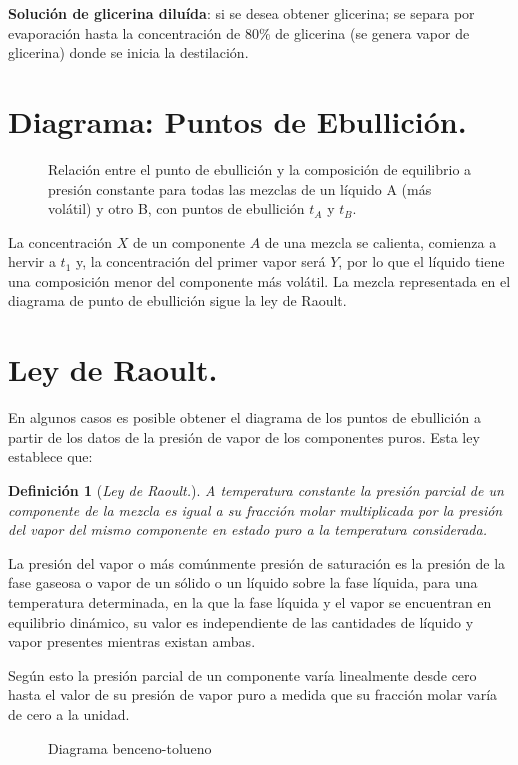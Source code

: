 \documentclass[11pt,openany]{book}
\newtheorem{defi}{Definición}
\begin{document}
\textbf{Solución de glicerina diluída}: si se desea obtener glicerina; se separa por evaporación hasta la 
concentración de 80\% de glicerina (se genera vapor de glicerina) donde se inicia la destilación.

\section{Diagrama: Puntos de Ebullición.}
\begin{figure}[h]

\caption{Relación entre el punto de ebullición y la composición de equilibrio a presión constante para todas las 
mezclas de un líquido A (más volátil) y otro B, con puntos de ebullición $t_A$ y $t_B$.
}
\end{figure}

La concentración $X$ de un componente $A$ de una mezcla se calienta, comienza a hervir a $t_1$ y, la 
concentración del primer vapor será $Y$, por lo que el líquido tiene una composición menor del componente más volátil.
La mezcla representada en el diagrama de punto de ebullición sigue la ley de Raoult.

\section{Ley de Raoult.}

En algunos casos es posible obtener el diagrama de los puntos de ebullición a partir de los datos de
 la presión de vapor de los componentes puros. Esta ley establece que: 
\begin{defi}[\textit{Ley de Raoult.}]
 A temperatura constante la presión parcial de un componente de la mezcla es igual a su fracción molar multiplicada por la 
 presión del vapor del mismo componente en estado puro a la temperatura considerada.
\end{defi}
 La presión del vapor o más comúnmente presión de saturación es la presión de la fase gaseosa o 
 vapor de un sólido o un líquido sobre la fase líquida, para una temperatura determinada, en la que 
 la fase líquida y el vapor se encuentran en equilibrio dinámico, su valor es independiente de las 
 cantidades de líquido y vapor presentes mientras existan ambas.

 Según esto la presión parcial de un componente varía linealmente desde cero hasta el valor de su 
 presión de vapor puro a medida que su fracción molar varía de cero a la unidad.

 \begin{figure}[h]
  \centering
  
  \caption{Diagrama benceno-tolueno}  
\end{figure}
  
\end{document}
